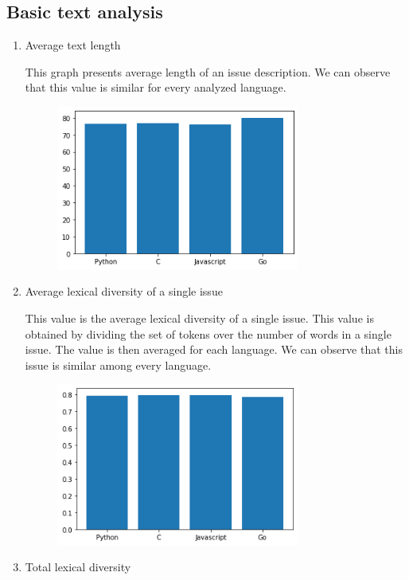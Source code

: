 \documentclass[]{article}
\begin{document}
\subsection{Basic text analysis}
\begin{enumerate}
    \item Average text length

          This graph presents average length of an issue description. We can observe that this value is similar for every analyzed language.


          \begin{figure}[H]
              \includegraphics[width=8cm]{avg_len.png}
              \centering
          \end{figure}

    \item Average lexical diversity of a single issue

          This value is the average lexical diversity of a single issue. This value is obtained by dividing the set of tokens over the number of words in a single issue. The value is then averaged for each language. We can observe that this issue is similar among every language.

          \begin{figure}[H]
              \includegraphics[width=8cm]{lex_div_single.png}
              \centering
          \end{figure}

    \item Total lexical diversity


\end{enumerate}
\end{document}
